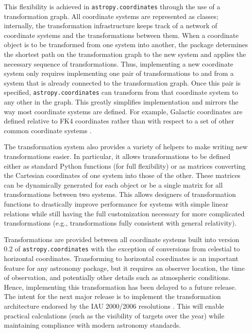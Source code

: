 \documentclass[traditabstract]{aa}
\begin{document}
This flexibility is achieved in \texttt{astropy.coordinates} through the use
of a transformation graph.
All coordinate systems are represented as classes; internally, the
transformation infrastructure keeps track of a network of coordinate systems
and the transformations between them.  When a coordinate
object is to be transformed from one system into another, the package determines the shortest path on
the transformation graph to the new system and applies the necessary
sequence of transformations. Thus, implementing a new coordinate system
only requires implementing one
pair of transformations to and from a system that is already connected to the
transformation graph. Once this pair is specified,
\texttt{astropy.coordinates} can transform from that coordinate
system to any other in the graph. This greatly simplifies
implementation and mirrors the way most coordinate systems are
defined. For example, Galactic coordinates are defined relative to FK4
coordinates rather than with respect to a set of other common coordinate
systems \citep{galcoords, reid04}.

The transformation system also provides a variety of helpers to make writing
new transformations easier.  In particular, it allows transformations to be
defined either as standard Python functions (for full flexibility) or as
matrices converting the Cartesian coordinates of one system into those of the
other. These matrices can be dynamically generated for each object or be a
single matrix for all transformations between two systems. This allows
designers of transformation functions to drastically improve performance for
systems with simple linear relations while still having the full
customization necessary for more complicated transformations (e.g.,
transformations fully consistent with general relativity).

Transformations are provided between all coordinate systems built into
version 0.2 of \texttt{astropy.coordinates} with the exception of conversions from
celestial to horizontal coordinates. Transforming to horizontal
coordinates is an important feature for any astronomy package,
but it requires an observer location, the time of observation,
and potentially other details such as atmospheric conditions.
Hence, implementing this transformation has been delayed to a
future release. The intent for the next major release is to implement the
transformation architecture endorsed by the IAU 2000/2006 resolutions
\citep[see e.g.,][]{soffel03, usnocircular179}. This will enable practical
calculations (such as the visibility of targets over the year) while maintaining
compliance with modern astronomy standards.
\end{document}
